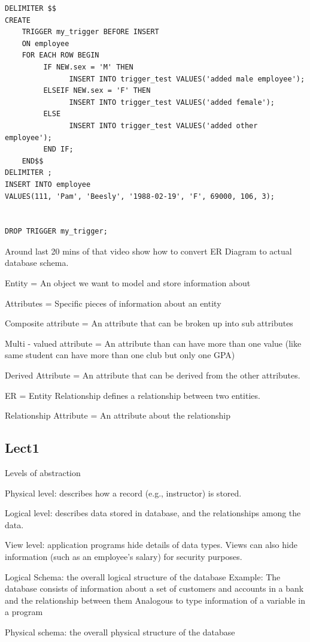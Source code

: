 \documentclass[8pt, a4paper, oneside, twocolumn]{extarticle}
\begin{document}
\begin{verbatim}
DELIMITER $$
CREATE
    TRIGGER my_trigger BEFORE INSERT
    ON employee
    FOR EACH ROW BEGIN 
         IF NEW.sex = 'M' THEN
               INSERT INTO trigger_test VALUES('added male employee');
         ELSEIF NEW.sex = 'F' THEN
               INSERT INTO trigger_test VALUES('added female');
         ELSE
               INSERT INTO trigger_test VALUES('added other employee');
         END IF;
    END$$
DELIMITER ;
INSERT INTO employee
VALUES(111, 'Pam', 'Beesly', '1988-02-19', 'F', 69000, 106, 3);


DROP TRIGGER my_trigger;
\end{verbatim}
Around last 20 mins of that video show how to convert ER Diagram to actual database schema.

Entity = An object we want to model and store information about

Attributes = Specific pieces of information about an entity

Composite attribute = An attribute that can be broken up into sub attributes

Multi - valued attribute = An attribute than can have more than one value (like same student can have more than one club but only one GPA)

Derived Attribute = An attribute that can be derived from the other attributes.

ER = Entity Relationship defines a relationship between two entities.

Relationship Attribute = An attribute about the relationship

\subsection{Lect1}
Levels of abstraction

Physical level: describes how a record (e.g., instructor) is stored.

Logical level: describes data stored in database, and the relationships among 
the data.

View level: application programs hide details of data types.  Views can also 
hide information (such as an employee’s salary) for security purposes. 

Logical Schema: the overall logical structure of the database 
Example: The database consists of information about a set of customers and 
accounts in a bank and the relationship between them
Analogous to type information of a variable in a program

Physical schema: the overall physical structure of the database 
\end{document}
